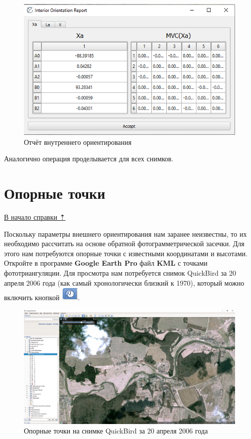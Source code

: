 \documentclass[
  12pt,
]{book}
\begin{document}
\begin{figure}
\centering
\includegraphics{images/Ref13/IO_Report.png}
\caption{Отчёт внутреннего ориентирования}
\end{figure}

Аналогично операция проделывается для всех снимков.

\hypertarget{stereo-GCP}{%
\section{Опорные точки}\label{stereo-GCP}}

\protect\hyperlink{stereo}{В начало справки ⇡}

Поскольку параметры внешнего ориентирования нам заранее неизвестны, то их необходимо рассчитать на основе обратной фотограмметрической засечки. Для этого нам потребуются опорные точки с известными координатами и высотами. Откройте в программе \textbf{Google Earth Pro} файл \textbf{KML} с точками фототриангуляции. Для просмотра нам потребуется снимок QuickBird за 20 апреля 2006 года (как самый хронологически близкий к 1970), который можно включить кнопкой \includegraphics{images/Ref13/Hystorical.png}.

\begin{figure}
\centering
\includegraphics{images/Ref13/QB2006.png}
\caption{Опорные точки на снимке QuickBird за 20 апреля 2006 года}
\end{figure}
\end{document}

